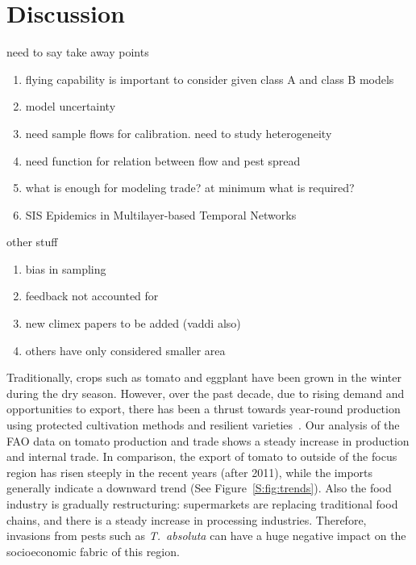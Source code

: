 \documentclass[11pt]{article}
\newcommand{\tuta}{\emph{T.~absoluta}}
\theoremstyle{definition}
\begin{document}
\section{Discussion}


need to say take away points
\begin{enumerate}
    \item flying capability is important to consider given class A and
    class B models
    \item model uncertainty
    \item need sample flows for calibration. need to study heterogeneity
    \item need function for relation between flow and pest spread
    \item what is enough for modeling trade? at minimum what is
    required?
    \item SIS Epidemics in Multilayer-based Temporal Networks
\end{enumerate}
other stuff
\begin{enumerate}
    \item bias in sampling
    \item feedback not accounted for
    \item new climex papers to be added (vaddi also)
    \item others have only considered smaller area
\end{enumerate}

Traditionally, crops such as tomato and eggplant have been grown in the
winter during the dry season. However, over the past decade, due to rising
demand and opportunities to export, there has been a thrust towards
year-round production using protected cultivation methods and resilient
varieties~\cite{ali2001}. Our analysis of the FAO data on
tomato production and trade shows a steady increase in production and
internal trade. In comparison, the export of tomato to outside of the focus
region has risen steeply in the recent years (after 2011), while the
imports generally indicate a downward trend (See
Figure~\ref{S:fig:trends}). Also the food industry is gradually
restructuring: supermarkets are replacing traditional food chains, and
there is a steady increase in processing industries. Therefore, invasions
from pests such as \tuta{} can have a huge negative impact on the
socioeconomic fabric of this region.
\end{document}
